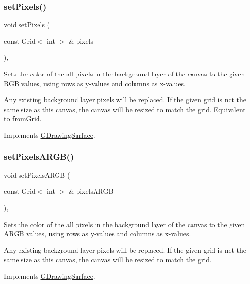 \subsubsection{\texorpdfstring{set\+Pixels()}{setPixels()}}
{\footnotesize\ttfamily void set\+Pixels (\begin{DoxyParamCaption}\item[{const Grid$<$ int $>$ \&}]{pixels }\end{DoxyParamCaption})\hspace{0.3cm}{\ttfamily [override]}, {\ttfamily [virtual]}}



Sets the color of the all pixels in the background layer of the canvas to the given R\+GB values, using rows as y-\/values and columns as x-\/values. 

Any existing background layer pixels will be replaced. If the given grid is not the same size as this canvas, the canvas will be resized to match the grid. Equivalent to from\+Grid. 

Implements \mbox{\hyperlink{classGDrawingSurface_aa80f4b7381bd418116baee600eed37fe}{G\+Drawing\+Surface}}.

\mbox{\label{classGCanvas_a6573789f75baf0b21122763e9a87c8df}} 
\subsubsection{\texorpdfstring{set\+Pixels\+A\+R\+G\+B()}{setPixelsARGB()}}
{\footnotesize\ttfamily void set\+Pixels\+A\+R\+GB (\begin{DoxyParamCaption}\item[{const Grid$<$ int $>$ \&}]{pixels\+A\+R\+GB }\end{DoxyParamCaption})\hspace{0.3cm}{\ttfamily [override]}, {\ttfamily [virtual]}}



Sets the color of the all pixels in the background layer of the canvas to the given A\+R\+GB values, using rows as y-\/values and columns as x-\/values. 

Any existing background layer pixels will be replaced. If the given grid is not the same size as this canvas, the canvas will be resized to match the grid. 

Implements \mbox{\hyperlink{classGDrawingSurface_a7d813f0f29751a217201f24cef402306}{G\+Drawing\+Surface}}.

